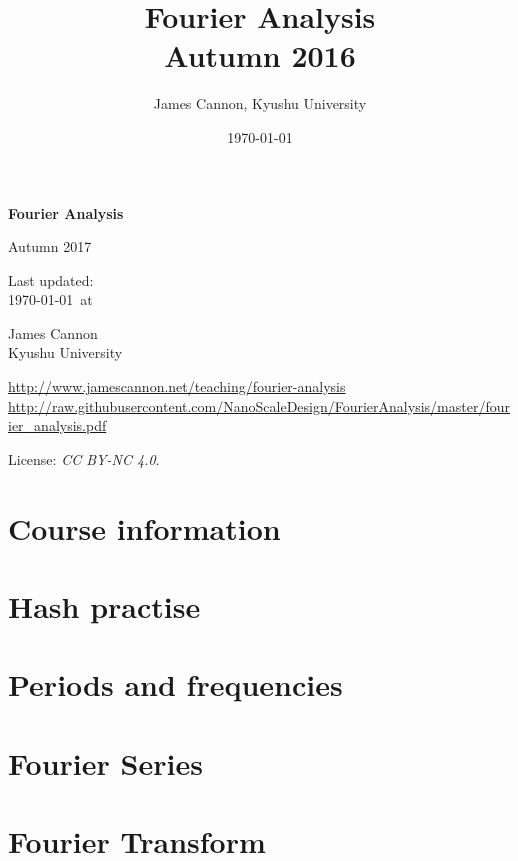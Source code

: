 \documentclass[a4paper]{book} %
\title{Fourier Analysis\\Autumn 2016}
\author{James Cannon, Kyushu University}
\date{\today}
\newcommand{\courseyear}{2017 }
\newcommand{\courseurl}{fourier-analysis}
\begin{document}
\begin{titlepage}
    \begin{center}
        \vspace*{1cm}

        \Huge
        \textbf{Fourier Analysis}

        Autumn \courseyear

        \vspace{1.5cm}
        \Large
        Last updated:\\\today \ at \currenttime

        \vspace{4.0cm}
        \LARGE
        James Cannon\\Kyushu University
        \vfill

        \normalsize
        \url{http://www.jamescannon.net/teaching/\courseurl}\\
        \vspace{0.2cm}
        \small
        \url{http://raw.githubusercontent.com/NanoScaleDesign/FourierAnalysis/master/fourier_analysis.pdf}
        \vspace{0.5cm}

        License: \emph{CC BY-NC 4.0}.

    \end{center}
\end{titlepage}

\setcounter{chapter}{-1}

\tableofcontents

\chapter{Course information}
\newpage



%

\chapter{Hash practise}

\chapter{Periods and frequencies}

\chapter{Fourier Series}

\chapter{Fourier Transform}

%
%
%
\end{document}
